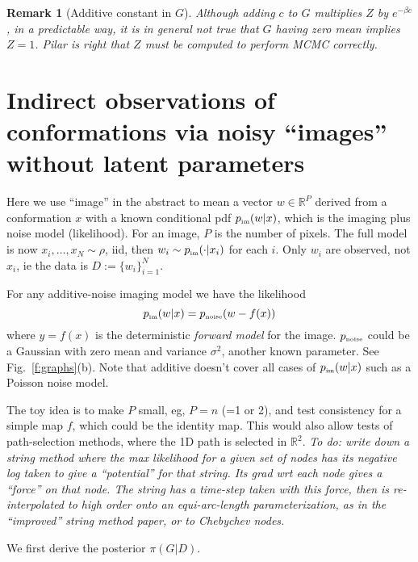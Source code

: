 \documentclass[10pt]{article}
\newcommand{\tbox}[1]{{\mbox{\tiny #1}}}
\newcommand{\R}{\mathbb{R}}
\newtheorem{rmk}[thm]{Remark}
\newcommand{\bt}{\beta}
\begin{document}
\begin{rmk}[Additive constant in $G$]
  Although adding $c$ to $G$ multiplies $Z$ by $e^{-\bt c}$, in a predictable way,
  it is in general not true that $G$ having zero mean implies $Z=1$.
  Pilar is right that $Z$ must be computed to perform MCMC correctly.
  \end{rmk}




\section{Indirect observations of conformations via noisy ``images'' without
latent parameters}

Here we use ``image'' in the abstract to mean a vector
$w\in \R^P$ derived from a conformation $x$ with a known conditional
pdf $p_\tbox{im}(w|x)$, which is the imaging plus noise model (likelihood).
For an image, $P$ is the number of pixels.
The full model is now $x_i,\dots,x_N \sim \rho$, iid, then
$w_i \sim p_\tbox{im}(\cdot | x_i)$ for each $i$.
Only $w_i$ are observed, not $x_i$, ie the data is $D:=\{w_i\}_{i=1}^N$.

For any additive-noise imaging model we have the likelihood
$$
p_\tbox{im}(w | x) = p_\tbox{noise}(w - f(x))
$$
where $y=f(x)$ is the deterministic {\em forward model} for the image.
$p_\tbox{noise}$ could be a Gaussian with zero mean and variance $\sigma^2$,
another known parameter.
See Fig.~\ref{f:graphs}(b).
Note that additive doesn't cover all cases of $p_\tbox{im}(w|x)$ such as a Poisson noise model.

The toy idea is to make $P$ small, eg, $P=n$ (=1 or 2), and test
consistency for a simple map $f$, which could be the identity map.
This would also allow tests of path-selection methods, where
the 1D path is selected in $\R^2$.
{\em To do: write down a string method where the max likelihood for a given
  set of nodes has its negative log taken to give a ``potential'' for that string. Its grad wrt each node gives a ``force'' on that node. The string has a time-step taken with this force, then is re-interpolated to high order onto an equi-arc-length parameterization, as in the ``improved'' string method paper, or to Chebychev nodes.}

We first derive the posterior $\pi(G|D)$.





\end{document}
